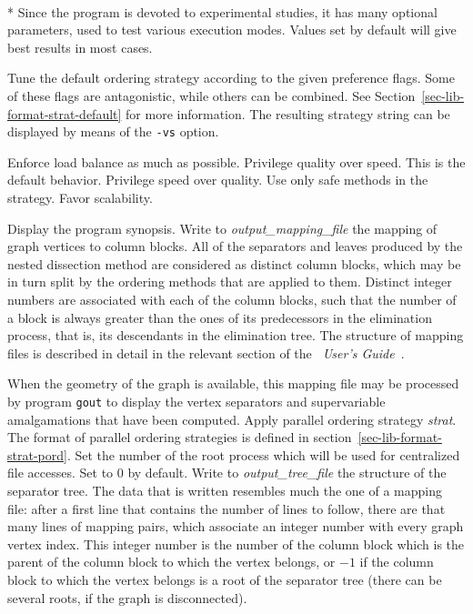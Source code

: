 \begin{itemize}
\progopt\\*
Since the program is devoted to experimental studies, it has many
optional parameters, used to test various execution modes. Values
set by default will give best results in most cases.
\begin{itemize}
\iteme[{\tt -c}{\it flags}]
Tune the default ordering strategy according to the given preference
flags. Some of these flags are antagonistic, while others can be
combined. See Section~\ref{sec-lib-format-strat-default} for more
information. The resulting strategy string can be displayed by means
of the {\tt -vs} option.
\begin{itemize}
\iteme[{\tt b}]
Enforce load balance as much as possible.
\iteme[{\tt q}]
Privilege quality over speed. This is the default behavior.
\iteme[{\tt s}]
Privilege speed over quality.
\iteme[{\tt t}]
Use only safe methods in the strategy.
\iteme[{\tt x}]
Favor scalability.
\end{itemize}
\iteme[{\tt -h}]
Display the program synopsis.
Write to {\it output\_mapping\_file\/} the mapping of graph vertices to
column blocks. All of the separators and leaves produced by the nested
dissection method are considered as distinct column blocks, which may
be in turn split by the ordering methods that are applied to them.
Distinct integer numbers are associated with each of the column blocks,
such that the number of a block is always greater than the ones of its
predecessors in the elimination process, that is, its descendants in
the elimination tree.
The structure of mapping files is described in detail in the relevant
section of the {\it\scotch\ User's Guide}~\scotchcitesuser.

When the geometry of the graph is available, this mapping file may be
processed by program {\tt gout} to display the vertex separators and
supervariable amalgamations that have been computed.
\iteme[{{\tt -o}{\it strat}}]
Apply parallel ordering strategy {\it strat}. The format of parallel
ordering strategies is defined in section~\ref{sec-lib-format-strat-pord}.
\iteme[{\tt -r}{\it num}]
Set the number of the root process which will be used for centralized
file accesses. Set to $0$ by default.
Write to {\it output\_tree\_file\/} the structure of the separator
tree. The data that is written resembles much the one of a mapping
file: after a first line that contains the number of lines to follow,
there are that many lines of mapping pairs, which associate an integer
number with every graph vertex index. This integer number is the
number of the column block which is the parent of the column block to
which the vertex belongs, or $-1$ if the column block to which the
vertex belongs is a root of the separator tree (there can be several
roots, if the graph is disconnected).


\end{itemize}
\end{itemize}
